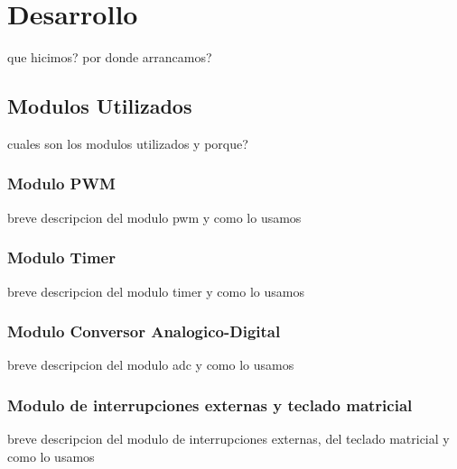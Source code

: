 \documentclass[a4paper]{article}
\begin{document}

\section{Desarrollo} %
\label{sec:desarrollo}

que hicimos? por donde arrancamos?


\subsection{Modulos Utilizados} %
\label{sub:modulos_utilizados}

cuales son los modulos utilizados y porque? 

\subsubsection{Modulo PWM} %
\label{ssub:modulo_pwm}

breve descripcion del modulo pwm y como lo usamos


\subsubsection{Modulo Timer} %
\label{ssub:modulo_timer}

breve descripcion del modulo timer y como lo usamos


\subsubsection{Modulo Conversor Analogico-Digital} %
\label{ssub:modulo_conversor_analogico_digital}

breve descripcion del modulo adc y como lo usamos


\subsubsection{Modulo de interrupciones externas y teclado matricial} %
\label{ssub:modulo_de_interrupciones_externas_y_teclado_matricial}

breve descripcion del modulo de interrupciones externas, del teclado matricial y como lo usamos
\end{document}
